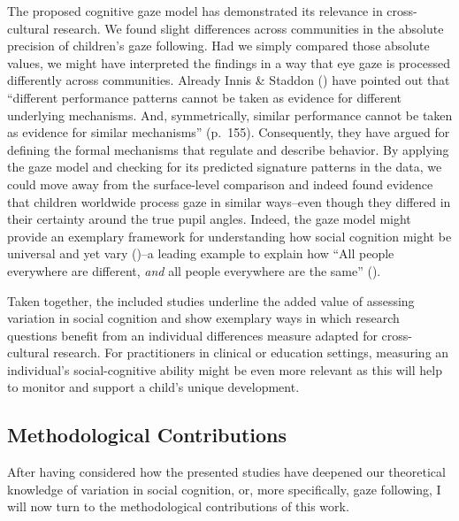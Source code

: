 \documentclass[
]{scrbook}
\begin{document}
The proposed cognitive gaze model has demonstrated its relevance in cross-cultural research. We found slight differences across communities in the absolute precision of children's gaze following. Had we simply compared those absolute values, we might have interpreted the findings in a way that eye gaze is processed differently across communities. Already Innis \& Staddon () have pointed out that ``different performance patterns cannot be taken as evidence for different underlying mechanisms. And, symmetrically, similar performance cannot be taken as evidence for similar mechanisms'' (p.~155). Consequently, they have argued for defining the formal mechanisms that regulate and describe behavior. By applying the gaze model and checking for its predicted signature patterns in the data, we could move away from the surface-level comparison and indeed found evidence that children worldwide process gaze in similar ways\thinspace --\thinspace even though they differed in their certainty around the true pupil angles. Indeed, the gaze model might provide an exemplary framework for understanding how social cognition might be universal and yet vary ()\thinspace --\thinspace a leading example to explain how ``All people everywhere are different, \emph{and} all people everywhere are the same'' ().

Taken together, the included studies underline the added value of assessing variation in social cognition and show exemplary ways in which research questions benefit from an individual differences measure adapted for cross-cultural research. For practitioners in clinical or education settings, measuring an individual's social-cognitive ability might be even more relevant as this will help to monitor and support a child's unique development.

\subsection{Methodological Contributions}\label{contributions-methods}

After having considered how the presented studies have deepened our theoretical knowledge of variation in social cognition, or, more specifically, gaze following, I will now turn to the methodological contributions of this work.
\end{document}
